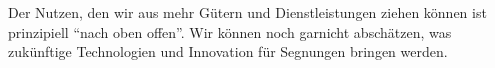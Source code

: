 Der Nutzen, den wir aus mehr Gütern und Dienstleistungen ziehen können ist prinzipiell ``nach oben offen''.
Wir können noch garnicht abschätzen, was zukünftige Technologien und Innovation für Segnungen bringen werden.